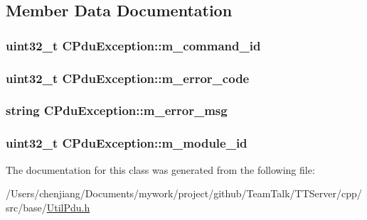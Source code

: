 \subsection{Member Data Documentation}
\hypertarget{class_c_pdu_exception_a5a11d340b24eff20084f78eb632b02d0}{}
\subsubsection[{m\+\_\+command\+\_\+id}]{\setlength{\rightskip}{0pt plus 5cm}uint32\+\_\+t C\+Pdu\+Exception\+::m\+\_\+command\+\_\+id\hspace{0.3cm}{\ttfamily [private]}}\label{class_c_pdu_exception_a5a11d340b24eff20084f78eb632b02d0}
\hypertarget{class_c_pdu_exception_af61943fb70c9b0e2d6573a924152a907}{}
\subsubsection[{m\+\_\+error\+\_\+code}]{\setlength{\rightskip}{0pt plus 5cm}uint32\+\_\+t C\+Pdu\+Exception\+::m\+\_\+error\+\_\+code\hspace{0.3cm}{\ttfamily [private]}}\label{class_c_pdu_exception_af61943fb70c9b0e2d6573a924152a907}
\hypertarget{class_c_pdu_exception_a7827c42132bad96adfef04d9c8c300fb}{}
\subsubsection[{m\+\_\+error\+\_\+msg}]{\setlength{\rightskip}{0pt plus 5cm}string C\+Pdu\+Exception\+::m\+\_\+error\+\_\+msg\hspace{0.3cm}{\ttfamily [private]}}\label{class_c_pdu_exception_a7827c42132bad96adfef04d9c8c300fb}
\hypertarget{class_c_pdu_exception_a25c775cee77bbb9b3af47c98421c536b}{}
\subsubsection[{m\+\_\+module\+\_\+id}]{\setlength{\rightskip}{0pt plus 5cm}uint32\+\_\+t C\+Pdu\+Exception\+::m\+\_\+module\+\_\+id\hspace{0.3cm}{\ttfamily [private]}}\label{class_c_pdu_exception_a25c775cee77bbb9b3af47c98421c536b}


The documentation for this class was generated from the following file\+:\begin{DoxyCompactItemize}
\item 
/\+Users/chenjiang/\+Documents/mywork/project/github/\+Team\+Talk/\+T\+T\+Server/cpp/src/base/\hyperlink{_util_pdu_8h}{Util\+Pdu.\+h}\end{DoxyCompactItemize}
